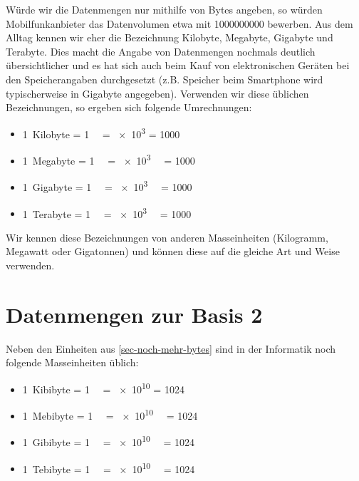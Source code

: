 Würde wir die Datenmengen nur mithilfe von Bytes angeben, so würden Mobilfunkanbieter das Datenvolumen etwa mit \qty{1000000000}{\byte} bewerben. Aus dem Alltag kennen wir eher die Bezeichnung Kilobyte, Megabyte, Gigabyte und Terabyte. Dies macht die Angabe von Datenmengen nochmals deutlich übersichtlicher und es hat sich auch beim Kauf von elektronischen Geräten bei den Speicherangaben durchgesetzt (z.B. Speicher beim Smartphone wird typischerweise in Gigabyte angegeben). Verwenden wir diese üblichen Bezeichnungen, so ergeben sich folgende Umrechnungen:

\begin{itemize}
\item \qty{1}{Kilobyte} = \qty{1}{\kilo\byte} = \qty{e3}{\byte} = \qty{1000}{\byte}
\item \qty{1}{Megabyte} = \qty{1}{\mega\byte} = \qty{e3}{\kilo\byte} = \qty{1000}{\kilo\byte}
\item \qty{1}{Gigabyte} = \qty{1}{\giga\byte} = \qty{e3}{\mega\byte} = \qty{1000}{\mega\byte}
\item \qty{1}{Terabyte} = \qty{1}{\tera\byte} = \qty{e3}{\giga\byte} = \qty{1000}{\giga\byte}
\end{itemize}

Wir kennen diese Bezeichnungen von anderen Masseinheiten (Kilogramm, Megawatt oder Gigatonnen) und können diese auf die gleiche Art und Weise verwenden.

\section{Datenmengen zur Basis 2}

Neben den Einheiten aus \autoref{sec-noch-mehr-bytes} sind in der Informatik noch folgende Masseinheiten üblich:

\begin{itemize}
\item \qty{1}{Kibibyte} = \qty{1}{\kibi\byte} = \qty{e10}{\byte} = \qty{1024}{\byte}
\item \qty{1}{Mebibyte} = \qty{1}{\mebi\byte} = \qty{e10}{\kibi\byte} = \qty{1024}{\kibi\byte}
\item \qty{1}{Gibibyte} = \qty{1}{\gibi\byte} = \qty{e10}{\mebi\byte} = \qty{1024}{\mebi\byte}
\item \qty{1}{Tebibyte} = \qty{1}{\tebi\byte} = \qty{e10}{\gibi\byte} = \qty{1024}{\gibi\byte}
\end{itemize}

